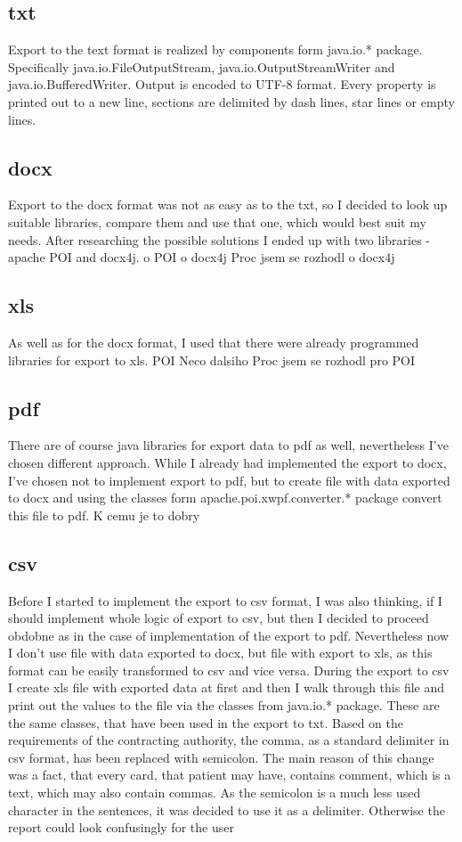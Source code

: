 \documentclass[thesis=B,english]{FITthesis}[2012/10/20]
\begin{document}
\subsection{txt}
Export to the text format is realized by components form java.io.* package. Specifically java.io.FileOutputStream, java.io.OutputStreamWriter and java.io.BufferedWriter. Output is encoded to UTF-8 format. Every property is printed out to a new line, sections are delimited by dash lines, star lines or empty lines.
\subsection{docx}
Export to the docx format was not as easy as to the txt, so I decided to look up suitable libraries, compare them and use that one, which would best suit my needs. After researching the possible solutions I ended up with two libraries - apache POI and docx4j.
o POI
o docx4j
Proc jsem se rozhodl o docx4j
\subsection{xls}
As well as for the docx format, I used that there were already programmed libraries for export to xls.
POI 
Neco dalsiho
Proc jsem se rozhodl pro POI
\subsection{pdf}
There are of course java libraries for export data to pdf as well, nevertheless I've chosen different approach. While I already had implemented the export to docx, I've chosen not to implement export to pdf, but to create file with data exported to docx and using the classes form apache.poi.xwpf.converter.* package convert this file to pdf.
K cemu je to dobry
\subsection{csv}
Before I started to implement the export to csv format, I was also thinking, if I should implement whole logic of export to csv, but then I decided to proceed obdobne as in the case of implementation of the export to pdf. Nevertheless now I don't use file with data exported to docx, but file with export to xls, as this format can be easily transformed to csv and vice versa. During the export to csv I create xls file with exported data at first and then I walk through this file and print out the values to the file via the classes from java.io.* package. These are the same classes, that have been used in the export to txt. Based on the requirements of the contracting authority, the comma, as a standard delimiter in csv format, has been replaced with semicolon. The main reason of this change was a fact, that every card, that patient may have, contains comment, which is a text, which may also contain commas. As the semicolon is a much less used character in the sentences, it was decided to use it as a delimiter. Otherwise the report could look confusingly for the user
\end{document}
